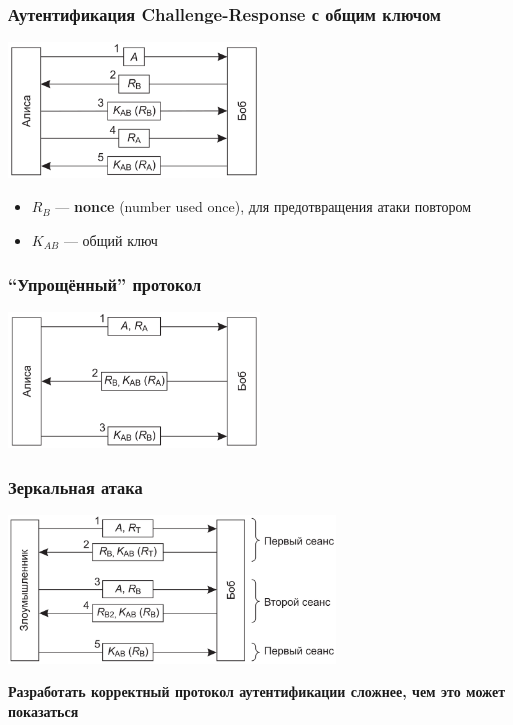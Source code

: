 \documentclass{../cscslides}
\begin{document}
    \begin{frame}
        \frametitle{Аутентификация Challenge-Response с общим ключом}
        \begin{center}
            \includegraphics[width=0.5\textwidth]{challengeResponse.png}
        \end{center}
        \begin{itemize}
            \item $R_B$ --- \textbf{nonce} (number used once), для предотвращения атаки повтором
            \item $K_{AB}$ --- общий ключ
        \end{itemize}
    \end{frame}

    \begin{frame}
        \frametitle{``Упрощённый'' протокол}
        \begin{center}
            \includegraphics[width=0.5\textwidth]{simpleChallengeResponse.png}
        \end{center}
    \end{frame}

    \begin{frame}
        \frametitle{Зеркальная атака}
        \begin{center}
            \includegraphics[width=0.65\textwidth]{mirrorAttack.png}
        \end{center}
        \vspace{5mm}
        \textbf{Разработать корректный протокол аутентификации сложнее, чем это может показаться}
    \end{frame}
\end{document}
